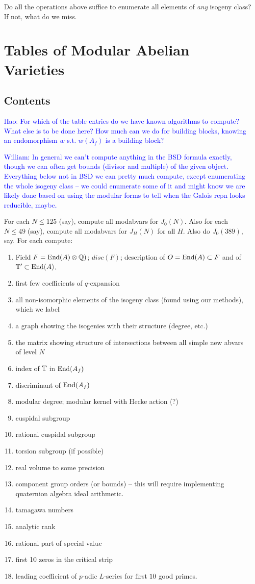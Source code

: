 \documentclass{article}
\newcommand{\Hao}[1]{\textcolor{blue}{\textsf{Hao: #1}}}
\newcommand{\wstein}[1]{\textcolor{blue}{\textsf{William: #1}}}
\begin{document}
Do all the  operations above suffice to enumerate all
elements of {\em any} isogeny class?   If not, what do we miss.


\section{Tables of Modular Abelian Varieties}
\subsection{Contents}

\Hao{For which of the table entries do we have known algorithms to compute? What else is to be done here? How much can we do for building blocks, knowing an endomorphism $w$ s.t. $w(A_f)$ is a building block?}

\wstein{In general we can't compute anything in the BSD formula exactly,
though we can often get bounds (divisor and multiple) of the given object.
Everything below not in BSD we can pretty much compute, except enumerating
the whole isogeny class -- we could enumerate some of it and might know
we are likely done based on using the modular forms to tell when the
Galois repn looks reducible, maybe.}

For each $N\leq 125$ (say), compute all modabvars for $J_0(N)$.
Also for each $N\leq 49$ (say), compute all modabvars for $J_H(N)$ for
all $H$.  Also do $J_0(389)$, say.
For each compute:
\begin{enumerate}
\item Field $F = \operatorname{End}(A)\otimes \mathbb{Q})$; $disc(F)$; description of $O=\operatorname{End}(A) \subset F$ and of $\mathbb{T}'\subset \operatorname{End}(A)$.
\item first few coefficients of $q$-expansion
\item all non-isomorphic elements of the isogeny class (found using our methods),
which we label
\item a graph showing the isogenies with their structure (degree, etc.)
\item the matrix showing structure of intersections between all simple new
abvars of level $N$
\item index of $\mathbb{T}$ in $\operatorname{End}(A_f)$
\item discriminant of $\operatorname{End}(A_f)$
\item modular degree; modular kernel with Hecke action (?)
\item cuspidal subgroup
\item rational cuspidal subgroup
\item torsion subgroup (if possible)
\item real volume to some precision
\item component group orders (or bounds) -- this will require
implementing quaternion algebra ideal arithmetic.
\item tamagawa numbers
\item analytic rank
\item rational part of special value
\item first 10 zeros in the critical strip
\item leading coefficient of $p$-adic $L$-series
for first $10$ good primes.
\end{enumerate}
\end{document}
